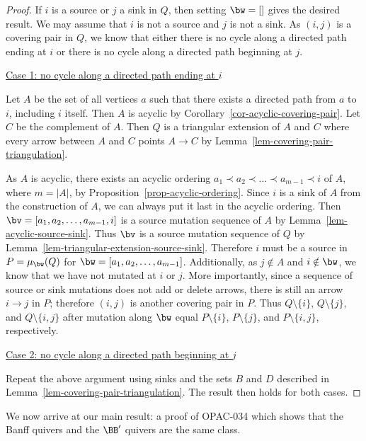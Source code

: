 \begin{proof}
    If $i$ is a source or $j$ a sink in $Q$, then setting $\bw = []$ gives the desired result.
    We may assume that $i$ is not a source and $j$ is not a sink.
    As $(i,j)$ is a covering pair in $Q$, we know that either there is no cycle along a directed path ending at $i$ or there is no cycle along a directed path beginning at $j$.

    \underline{Case 1: no cycle along a directed path ending at $i$}

    Let $A$ be the set of all vertices $a$ such that there exists a directed path from $a$ to $i$, including $i$ itself.
    Then $A$ is acyclic by Corollary~\ref{cor-acyclic-covering-pair}.
    Let $C$ be the complement of $A$.
    Then $Q$ is a triangular extension of $A$ and $C$ where every arrow between $A$ and $C$ points $A \to C$ by Lemma~\ref{lem-covering-pair-triangulation}.

    As $A$ is acyclic, there exists an acyclic ordering $a_1 \prec a_2 \prec \dots \prec a_{m-1} \prec i$ of $A$, where $m = |A|$, by Proposition~\ref{prop-acyclic-ordering}.
    Since $i$ is a sink of $A$ from the construction of $A$, we can always put it last in the acyclic ordering.
    Then $\bv = [a_1,a_{2},\dots,a_{m-1},i]$ is a source mutation sequence of $A$ by Lemma~\ref{lem-acyclic-source-sink}.
    Thus $\bv$ is a source mutation sequence of $Q$ by Lemma~\ref{lem-triangular-extension-source-sink}.
    Therefore $i$ must be a source in $P = \mu_{\bw}(Q)$ for $\bw = [a_1,a_2,\dots,a_{m-1}]$.
    Additionally, as $j \notin A$ and $i \notin \bw$, we know that we have not mutated at $i$ or $j$.
    More importantly, since a sequence of source or sink mutations does not add or delete arrows, there is still an arrow $i \to j$ in $P$; therefore $(i,j)$ is another covering pair in $P$.
    Thus $Q \setminus \{i\}$, $Q \setminus \{j\}$, and $Q \setminus \{i,j\}$ after mutation along $\bw$ equal $P \setminus \{i\}$, $P \setminus \{j\}$, and $P \setminus \{i,j\}$, respectively.
    
    \underline{Case 2: no cycle along a directed path beginning at $j$}

    Repeat the above argument using sinks and the sets $B$ and $D$ described in Lemma~\ref{lem-covering-pair-triangulation}.
    The result then holds for both cases.
\end{proof}

We now arrive at our main result: a proof of OPAC-034 which shows that the Banff quivers and the $\BB'$ quivers are the same class.

